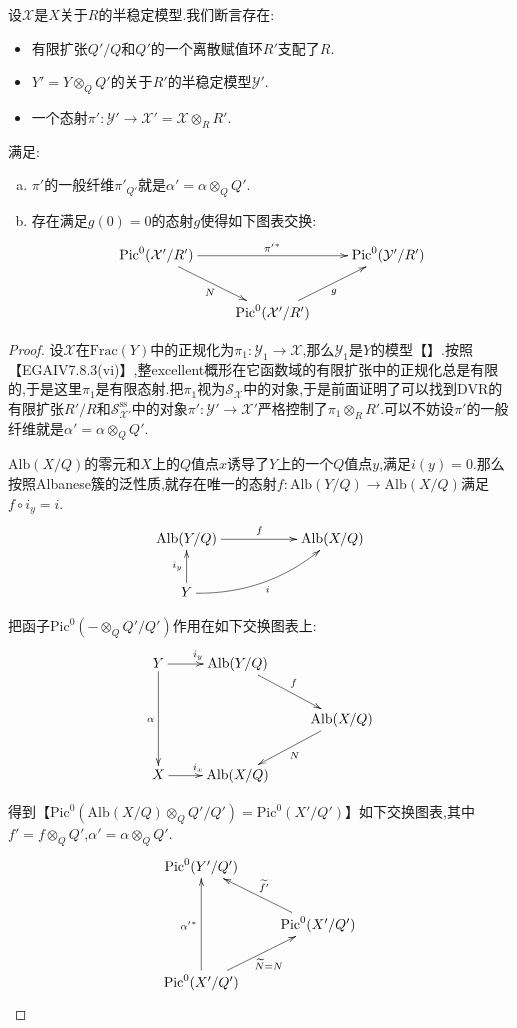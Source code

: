 \begin{enumerate}
    设$\mathcal{X}$是$X$关于$R$的半稳定模型.我们断言存在:
    \begin{itemize}
    	\item 有限扩张$Q'/Q$和$Q'$的一个离散赋值环$R'$支配了$R$.
    	\item $Y'=Y\otimes_QQ'$的关于$R'$的半稳定模型$\mathcal{Y}'$.
    	\item 一个态射$\pi':\mathcal{Y}'\to\mathcal{X}'=\mathcal{X}\otimes_RR'$.
    \end{itemize}
    
    满足:
    \begin{enumerate}[(a)]
    	\item $\pi'$的一般纤维$\pi'_{Q'}$就是$\alpha'=\alpha\otimes_QQ'$.
    	\item 存在满足$g(0)=0$的态射$g$使得如下图表交换:
    	$$\xymatrix{\mathrm{Pic}^0(\mathcal{X}'/R')\ar[dr]_N\ar[rr]^{{\pi'}^*}&&\mathrm{Pic}^0(\mathcal{Y}'/R')\\&\mathrm{Pic}^0(\mathcal{X}'/R')\ar[ur]_g&}$$
    \end{enumerate}
    \begin{proof}
    	
    	设$\mathcal{X}$在$\mathrm{Frac}(Y)$中的正规化为$\pi_1:\mathcal{Y}_1\to\mathcal{X}$,那么$\mathcal{Y}_1$是$Y$的模型【】.按照【EGAIV7.8.3(vi)】,整excellent概形在它函数域的有限扩张中的正规化总是有限的,于是这里$\pi_1$是有限态射.把$\pi_1$视为$\mathcal{S}_{\mathcal{X}}$中的对象,于是前面证明了可以找到DVR的有限扩张$R'/R$和$\mathcal{S}_{\mathcal{X}'}^{\mathrm{ss}}$中的对象$\pi':\mathcal{Y}'\to\mathcal{X}'$严格控制了$\pi_1\otimes_RR'$.可以不妨设$\pi'$的一般纤维就是$\alpha'=\alpha\otimes_QQ'$.
    	
    	\qquad
    	
    	$\mathrm{Alb}(X/Q)$的零元和$X$上的$Q$值点$x$诱导了$Y$上的一个$Q$值点$y$,满足$i(y)=0$.那么按照Albanese簇的泛性质,就存在唯一的态射$f:\mathrm{Alb}(Y/Q)\to\mathrm{Alb}(X/Q)$满足$f\circ i_y=i$.
    	$$\xymatrix{\mathrm{Alb}(Y/Q)\ar[rr]^f&&\mathrm{Alb}(X/Q)\\Y\ar[u]^{i_y}\ar@/_1pc/[urr]_i&&}$$
    	
    	把函子$\mathrm{Pic}^0(-\otimes_QQ'/Q')$作用在如下交换图表上:
    	$$\xymatrix{Y\ar[r]^{i_y}\ar[dd]_{\alpha}&\mathrm{Alb}(Y/Q)\ar[dr]^f&\\&&\mathrm{Alb}(X/Q)\ar[dl]^N\\X\ar[r]^{i_x}&\mathrm{Alb}(X/Q)&}$$
    	
    	得到【$\mathrm{Pic}^0(\mathrm{Alb}(X/Q)\otimes_QQ'/Q')=\mathrm{Pic}^0(X'/Q')$】如下交换图表,其中$f'=f\otimes_QQ'$,$\alpha'=\alpha\otimes_QQ'$.
    	$$\xymatrix{\mathrm{Pic}^0(Y'/Q')&\\&\mathrm{Pic}^0(X'/Q')\ar[ul]_{\widetilde{f'}}\\\mathrm{Pic}^0(X'/Q')\ar[uu]^{{\alpha'}^*}\ar[ur]_{\widetilde{N}=N}&}$$
    	

\end{proof}
\end{enumerate}

